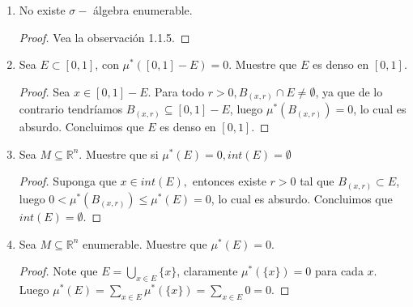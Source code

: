 \documentclass[spanish,12pt,a4paper,openany]{book}
\begin{document}
\begin{enumerate}
				\begin{proof}
					Como $\dfrac{\partial f}{\partial x_{1}} (x)$ existe para cada $x \in \mathbb{R}^{n}$ Entonces 
					\begin{align*}
						\lim_{h \rightarrow 0} \dfrac{f(x_{1} + h, ... , (x_{n})) - f(x_{1}, ..., x_{n})}{h}
					\end{align*}
					Existe para cada $x \in \mathbb{R}^{n}$. Con esto en mente podemos definir la siguiente sucesión de funciones $f_{n} : \mathbb{R}^{n} \rightarrow \mathbb{R}$ como sigue.
					\begin{align*}
						f_{n}(x) = \dfrac{f\left(x_{1} + \frac{1}{n}, ... , x_{n}\right)}{\frac{1}{n}}
					\end{align*}
					Como $f$ es medible, para cada $n \geq 1$, tenemos que $f_{n}$ lo es también y que $d\frac{\partial f}{\partial x_{1}} = \lim_{n \rightarrow \infty} f_{n}$ también es medible.
				\end{proof}
			
			\item No existe $\sigma-$ álgebra enumerable.
			
				\begin{proof}
					Vea la observación 1.1.5.
				\end{proof}
			
			\item Sea $E \subset [0,1]$, con $\mu^{*}([0,1] - E) = 0$. Muestre que $E$ es denso en $[0,1]$.
			
				\begin{proof}
					Sea $x \in [0,1] - E$. Para todo $r>0, B_{(x,r)} \cap E \neq \emptyset$, ya que de lo contrario tendríamos $B_{(x,r)} \subseteq [0,1] - E$, luego $\mu^{*} (B_{(x,r)}) = 0$, lo cual es absurdo. Concluimos que $E$ es denso en $[0,1]$. 
				\end{proof}
			
			\item Sea $M \subseteq \mathbb{R}^{n}$. Muestre que si $\mu^{*}(E) = 0, int(E) = \emptyset$
			
				\begin{proof}
					Suponga que $x \in int(E),$ entonces existe $r > 0$ tal que $B_{(x,r)} \subset E$, luego $0 < \mu^{*}(B_{(x,r)}) \leq \mu^{*} (E) = 0$, lo cual es absurdo. Concluimos que $int (E)   =  \emptyset$.
				\end{proof}
			
			\item Sea $M \subseteq \mathbb{R}^{n}$ enumerable. Muestre que $\mu^{*}(E) = 0$.
			
				\begin{proof}
					Note que $E = \bigcup_{x \in E} \{ x \}$, claramente $\mu^{*} (\{ x \}) = 0$ para cada $x$. Luego $\mu ^{*} (E) = \sum_{x \in E} \mu^{*}(\{x\}) = \sum_{x \in E} 0 = 0$.
				\end{proof}		
		\end{enumerate}
\end{document}
